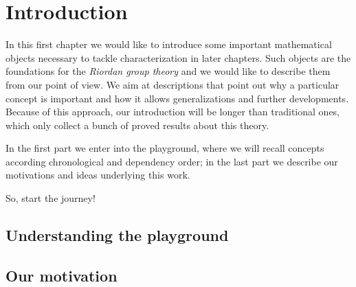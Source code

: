 
\chapter{Introduction}

In this first chapter we would like to introduce some
important mathematical objects necessary to tackle 
characterization in later chapters. Such objects are the 
foundations for the \emph{Riordan group theory} and 
we would like to describe them from our point of view.
We aim at descriptions that point out why a particular 
concept is important and how it allows generalizations
and further developments. Because of this approach,
our introduction will be longer than traditional ones,
which only collect a bunch of proved results about this theory.

In the first part we enter into the playground, where
we will recall concepts according chronological and
dependency order; in the last part we describe our motivations
and ideas underlying this work. 

So, start the journey!

\section{Understanding the playground}









\section{Our motivation}

